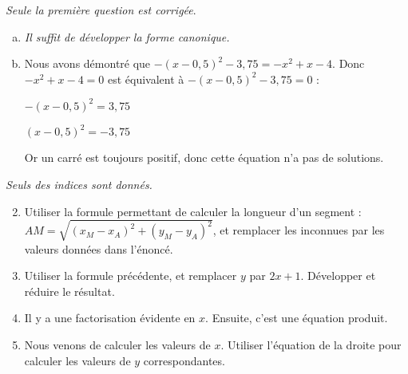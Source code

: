 \documentclass[11pt]{article}
\begin{document}
\begin{exercice}\emph{Seule la première question est corrigée}.
  \begin{enumerate}[(a)]
    \item \emph{Il suffit de développer la forme canonique.}
    \item Nous avons démontré que $-(x-0,5)^2-3,75=-x^2+x-4$. Donc 
    $-x^2+x-4=0$ est équivalent à $-(x-0,5)^2-3,75=0$ :

    $-(x-0,5)^2=3,75$

    $(x-0,5)^2=-3,75$

    Or un carré est toujours positif, donc cette équation n'a pas de solutions.
  \end{enumerate}
\end{exercice}

\begin{exercice}[Géométrie]\emph{Seuls des indices sont donnés.}
  \begin{enumerate}
      \setcounter{enumi}{1}
    \item Utiliser la formule permettant de calculer la longueur d'un segment : $AM=\sqrt{(x_M-x_A)^2+(y_M-y_A)^2}$, et remplacer les inconnues par les valeurs données dans l'énoncé.
    \item Utiliser la formule précédente, et remplacer $y$ par $2x+1$. Développer et réduire le résultat.
    \item Il y a une factorisation évidente en $x$. Ensuite, c'est une équation produit.
    \item Nous venons de calculer les valeurs de $x$. Utiliser l'équation de la droite pour calculer les valeurs de $y$ correspondantes.
  \end{enumerate}
\end{exercice}
\end{document}
